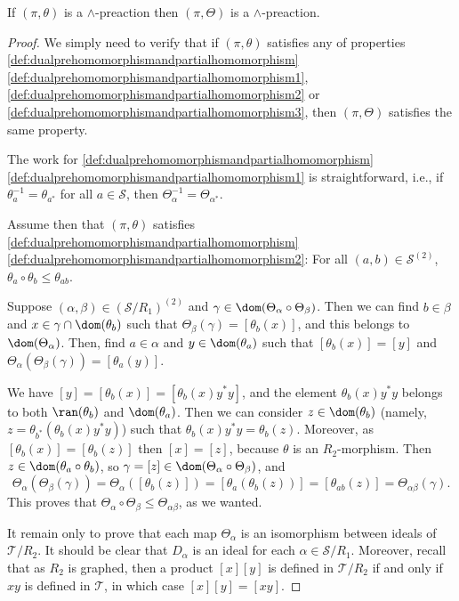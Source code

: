 \begin{proposition}
If $(\pi,\theta)$ is a $\land$-preaction then $(\pi,\Theta)$ is a $\land$-preaction.
\end{proposition}
\begin{proof}
    We simply need to verify that if $(\pi,\theta)$ satisfies any of properties \ref{def:dualprehomomorphismandpartialhomomorphism}\ref{def:dualprehomomorphismandpartialhomomorphism1}, \ref{def:dualprehomomorphismandpartialhomomorphism2} or \ref{def:dualprehomomorphismandpartialhomomorphism3}, then $(\pi,\Theta)$ satisfies the same property.
    
    The work for \ref{def:dualprehomomorphismandpartialhomomorphism}\ref{def:dualprehomomorphismandpartialhomomorphism1} is straightforward, i.e., if $\theta_a^{-1}=\theta_{a^*}$ for all $a\in\mathcal{S}$, then $\Theta_\alpha^{-1}=\Theta_{\alpha^*}$.
    
    Assume then that $(\pi,\theta)$ satisfies \ref{def:dualprehomomorphismandpartialhomomorphism}\ref{def:dualprehomomorphismandpartialhomomorphism2}: For all $(a,b)\in\mathcal{S}^{(2)}$, $\theta_a\circ\theta_b\leq\theta_{ab}$.
    
    Suppose $(\alpha,\beta)\in(\mathcal{S}/R_1)^{(2)}$ and $\gamma\in\dom(\Theta_\alpha\circ\Theta_\beta)$. Then we can find $b\in\beta$ and $x\in\gamma\cap\dom(\theta_b)$ such that $\Theta_\beta(\gamma)=[\theta_b(x)]$, and this belongs to $\dom(\Theta_\alpha)$. Then, find $a\in\alpha$ and $y\in\dom(\theta_a)$ such that $[\theta_b(x)]=[y]$ and $\Theta_\alpha(\Theta_\beta(\gamma))=[\theta_a(y)]$.
    
    We have $[y]=[\theta_b(x)]=[\theta_b(x)y^*y]$, and the element $\theta_b(x)y^*y$ belongs to both $\ran(\theta_b)$ and $\dom(\theta_a)$. Then we can consider $z\in\dom(\theta_b)$ (namely, $z=\theta_{b^*}(\theta_b(x)y^*y)$) such that $\theta_b(x)y^*y=\theta_b(z)$. Moreover, as $[\theta_b(x)]=[\theta_b(z)]$ then $[x]=[z]$, because $\theta$ is an $R_2$-morphism. Then $z\in\dom(\theta_a\circ\theta_b)$, so $\gamma=[z]\in\dom(\Theta_\alpha\circ\Theta_\beta)$, and
    \[\Theta_\alpha(\Theta_\beta(\gamma))=\Theta_\alpha([\theta_b(z)])=[\theta_a(\theta_b(z))]=[\theta_{ab}(z)]=\Theta_{\alpha\beta}(\gamma).\]
    This proves that $\Theta_\alpha\circ\Theta_\beta\leq\Theta_{\alpha\beta}$, as we wanted.
    
    It remain only to prove that each map $\Theta_\alpha$ is an isomorphism between ideals of $\mathcal{T}/R_2$. It should be clear that $D_\alpha$ is an ideal for each $\alpha\in\mathcal{S}/R_1$. Moreover, recall that as $R_2$ is graphed, then a product $[x][y]$ is defined in $\mathcal{T}/R_2$ if and only if $xy$ is defined in $\mathcal{T}$, in which case $[x][y]=[xy]$.
    

\end{proof}
